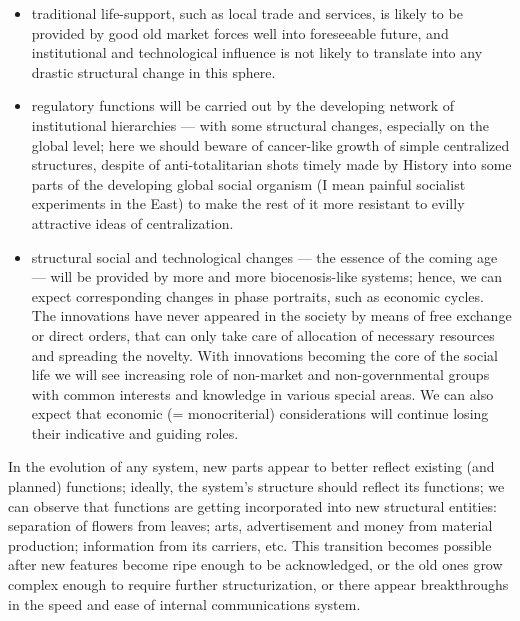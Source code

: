 \begin{itemize}
\item   traditional life-support, such as local trade and services, is
likely  to be provided by good old market forces well into foreseeable
future, and institutional and technological influence is not likely to
translate into any drastic structural change in this sphere.

\item     regulatory functions will be carried  out  by  the  developing
network  of  institutional hierarchies --- with some structural changes,
especially on the global level; here we should beware  of  cancer-like
growth  of simple centralized structures, despite of anti-totalitarian
shots timely made by History into some parts of the developing  global
social  organism (I mean painful socialist experiments in the East) to
make the rest of it more  resistant  to  evilly  attractive  ideas  of
centralization.

\item    structural social and technological changes --- the  essence  of
the  coming  age  ---  will be provided by more and more biocenosis-like
systems;  hence,  we  can  expect  corresponding  changes   in   phase
portraits,  such  as  economic  cycles.   The  innovations  have never
appeared in the society by means of free exchange  or  direct  orders,
that  can  only  take  care  of  allocation of necessary resources and
spreading the novelty.  With innovations  becoming  the  core  of  the
social   life   we   will   see  increasing  role  of  non-market  and
non-governmental groups with common interests and knowledge in various
special  areas.   We  can  also expect that economic (= monocriterial)
considerations will  continue  losing  their  indicative  and  guiding
roles.
\end{itemize}

     In the evolution of  any  system,  new  parts  appear  to  better
reflect  existing  (and  planned)  functions;  ideally,  the  system's
structure should reflect its functions; we can observe that  functions
are  getting incorporated into new structural entities:  separation of
flowers from leaves;  arts,  advertisement  and  money  from  material
production;  information  from  its  carriers,  etc.   This transition
becomes  possible  after  new  features  become  ripe  enough  to   be
acknowledged,  or  the old ones grow complex enough to require further
structurization, or there appear breakthroughs in the speed  and  ease
of internal communications system.

